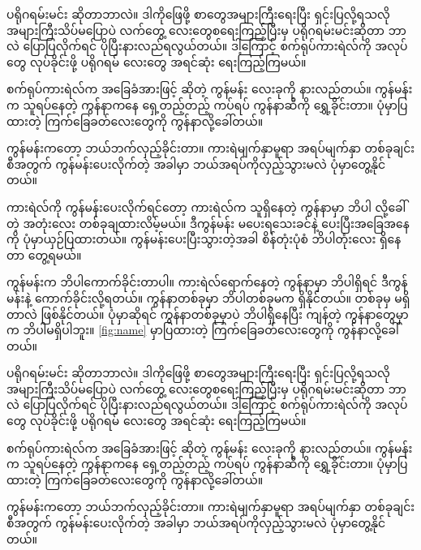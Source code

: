 \begin{sloppypar}
ပရိုဂရမ်းမင်း ဆိုတာဘာလဲ။ ဒါကိုဖြေဖို့ စာတွေအများကြီးရေးပြီး ရှင်းပြလို့ရသလို အများကြီးသိပ်မပြောပဲ လက်တွေ့  လေးတွေစရေးကြည့်ပြီးမှ ပရိုဂရမ်းမင်းဆိုတာ ဘာလဲ ပြောပြလိုက်ရင် ပိုပြီးနားလည်ရလွယ်တယ်။ ဒါ့ကြောင့် စက်ရုပ်ကားရဲလ်ကို အလုပ်တွေ လုပ်ခိုင်းဖို့ ပရိုဂရမ် လေးတွေ အရင်ဆုံး ရေးကြည့်ကြမယ်။

စက်ရုပ်ကားရဲလ်က အခြေခံအားဖြင့်  ဆိုတဲ့ ကွန်မန်း လေးခုကို နားလည်တယ်။  ကွန်မန်းက သူရပ်နေတဲ့ ကွန်နာကနေ ရှေ့တည့်တည့် ကပ်ရပ် ကွန်နာဆီကို ရွှေ့ခိုင်းတာ။ ပုံမှာပြထားတဲ့ ကြက်ခြေခတ်လေးတွေကို ကွန်နာလို့ခေါ်တယ်။ 

 ကွန်မန်းကတော့ ဘယ်ဘက်လှည့်ခိုင်းတာ။ ကားရဲမျက်နှာမူရာ အရပ်မျက်နှာ တစ်ခုချင်းစီအတွက်  ကွန်မန်းပေးလိုက်တဲ့ အခါမှာ ဘယ်အရပ်ကိုလှည့်သွားမလဲ ပုံမှာတွေ့နိုင်တယ်။

ကားရဲလ်ကို  ကွန်မန်းပေးလိုက်ရင်တော့ ကားရဲလ်က သူရှိနေတဲ့ ကွန်နာမှာ ဘိပါ လို့ခေါ်တဲ့ အတုံးလေး တစ်ခုချထားလိမ့်မယ်။ ဒီကွန်မန်း မပေးရသေးခင်နဲ့ ပေးပြီးအခြေအနေကို ပုံမှာယှဉ်ပြထားတယ်။ ကွန်မန်းပေးပြီးသွားတဲ့အခါ စိန်တုံးပုံစံ ဘိပါတုံးလေး ရှိနေတာ တွေ့ရမယ်။ 

 ကွန်မန်းက ဘိပါကောက်ခိုင်းတာပါ။ ကားရဲလ်ရောက်နေတဲ့ ကွန်နာမှာ ဘိပါရှိရင် ဒီကွန်မန်းနဲ့ ကောက်ခိုင်းလို့ရတယ်။ ကွန်နာတစ်ခုမှာ ဘိပါတစ်ခုမက ရှိနိုင်တယ်။ တစ်ခုမှ မရှိတာလဲ ဖြစ်နိုင်တယ်။ ပုံမှာဆိုရင် ကွန်နာတစ်ခုမှာပဲ ဘိပါရှိနေပြီး ကျန်တဲ့ ကွန်နာတွေမှာက ဘိပါမရှိပါဘူး။ \vref*{fig:name} မှာပြထားတဲ့ ကြက်ခြေခတ်လေးတွေကို ကွန်နာလို့ခေါ်တယ်။ 

ပရိုဂရမ်းမင်း ဆိုတာဘာလဲ။ ဒါကိုဖြေဖို့ စာတွေအများကြီးရေးပြီး ရှင်းပြလို့ရသလို အများကြီးသိပ်မပြောပဲ လက်တွေ့  လေးတွေစရေးကြည့်ပြီးမှ ပရိုဂရမ်းမင်းဆိုတာ ဘာလဲ ပြောပြလိုက်ရင် ပိုပြီးနားလည်ရလွယ်တယ်။ ဒါ့ကြောင့် စက်ရုပ်ကားရဲလ်ကို အလုပ်တွေ လုပ်ခိုင်းဖို့ ပရိုဂရမ် လေးတွေ အရင်ဆုံး ရေးကြည့်ကြမယ်။

စက်ရုပ်ကားရဲလ်က အခြေခံအားဖြင့်  ဆိုတဲ့ ကွန်မန်း လေးခုကို နားလည်တယ်။  ကွန်မန်းက သူရပ်နေတဲ့ ကွန်နာကနေ ရှေ့တည့်တည့် ကပ်ရပ် ကွန်နာဆီကို ရွှေ့ခိုင်းတာ။ ပုံမှာပြထားတဲ့ ကြက်ခြေခတ်လေးတွေကို ကွန်နာလို့ခေါ်တယ်။ 

 ကွန်မန်းကတော့ ဘယ်ဘက်လှည့်ခိုင်းတာ။ ကားရဲမျက်နှာမူရာ အရပ်မျက်နှာ တစ်ခုချင်းစီအတွက်  ကွန်မန်းပေးလိုက်တဲ့ အခါမှာ ဘယ်အရပ်ကိုလှည့်သွားမလဲ ပုံမှာတွေ့နိုင်တယ်။


\end{sloppypar}
